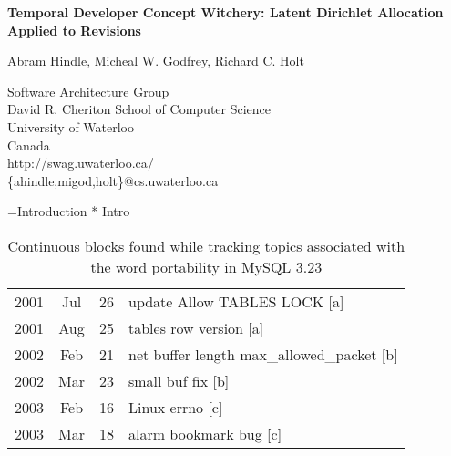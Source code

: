 \documentclass[titlepage,usenames,a4,landscape,semhelv]{seminar}
\author{
\names \\ 
{\small Software Architecture Group }\\
\small David R. Cheriton School of Computer Science\\
\small University of Waterloo\\
\small Canada\\
ahindle@cs.uwaterloo.ca
}
\newcommand{\gettitle}{Temporal Developer Concept Witchery: Latent Dirichlet Allocation Applied to Revisions}
\newcommand{\gettitleproper}{\gettitle}
\newcommand{\names}{Abram Hindle, Micheal W. Godfrey, Richard C. Holt}
\begin{document}
\pagestyle{fancy} %
\begin{slide}

\begin{center}
{\bf \LARGE \gettitleproper }

{\names } 

{\small Software Architecture Group }\\[-.5em]
{\small David R. Cheriton School of Computer Science}\\[-.5em]
{\small University of Waterloo}\\[-.5em]
{\small Canada}\\[-.5em]
{\small http://swag.uwaterloo.ca/}\\
\{ahindle,migod,holt\}@cs.uwaterloo.ca


\end{center}

=Introduction
* Intro

\newslide

\begin{table*}
\centering
\begin{tabular}{|ccc|l|}

\hline
2001 &  Jul &  26 &    update Allow TABLES LOCK [a] \\ 

2001 &  Aug &  25 &    tables row version [a] \\
\hline
\hline
2002 &  Feb &  21 &    net buffer length  max\_allowed\_packet [b] \\
2002 &  Mar &  23 &    small buf fix [b]  \\
\hline
\hline
2003 &  Feb &  16 &    Linux errno  [c] \\
2003 &  Mar &  18 &    alarm bookmark bug [c] \\
\hline
\end{tabular}
\caption{Continuous blocks found while tracking topics associated with the word portability in MySQL 3.23}
\label{tab:portability}
\end{table*}


\end{slide}
\end{document}
